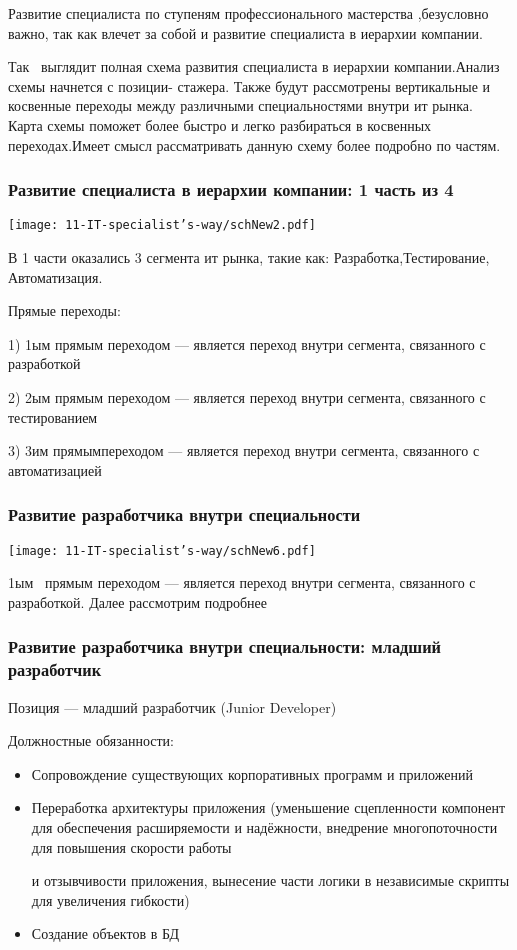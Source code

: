 \documentclass{../industrial-development}
\begin{document}
Развитие  специалиста по ступеням профессионального мастерства ,безусловно важно, так как влечет за собой и развитие специалиста в иерархии компании.

Так~\cite{mc} выглядит полная схема развития специалиста в иерархии компании.Анализ схемы начнется с позиции- стажера. Также  будут рассмотрены вертикальные и косвенные переходы между различными специальностями внутри ит рынка. Карта схемы поможет более быстро и легко разбираться в косвенных переходах.Имеет смысл рассматривать данную схему более подробно по частям.

\begin{frame} \frametitle{Развитие  специалиста в иерархии компании: 1 часть из 4 }
  \centerline{\texttt{[image: 11-IT-specialist's-way/schNew2.pdf]}}
\end{frame}

\lecturenotes

В 1 части оказались 3 сегмента ит рынка, такие как: Разработка,Тестирование, Автоматизация.

Прямые переходы:

1) 1ым прямым переходом --- является переход внутри сегмента, связанного с разработкой

2) 2ым прямым переходом --- является переход внутри сегмента, связанного с тестированием

3) 3им прямымпереходом --- является переход внутри сегмента, связанного с автоматизацией


\begin{frame} \frametitle{ Развитие разработчика внутри специальности}
 \centerline{\texttt{[image: 11-IT-specialist's-way/schNew6.pdf]}}
\end{frame}

\lecturenotes
 
1ым~\cite{mc} прямым переходом --- является переход внутри сегмента, связанного с разработкой. Далее рассмотрим подробнее

\begin{frame} \frametitle{Развитие разработчика внутри специальности: младший разработчик}
 \begin{block}{}
  \alert{Позиция --- младший разработчик (Junior Developer)}

Должностные обязанности: 
  \end{block}
  \begin{itemize}
  \item Сопровождение существующих корпоративных программ и приложений
  \item Переработка архитектуры приложения (уменьшение сцепленности компонент для обеспечения расширяемости и надёжности, внедрение многопоточности для повышения скорости работы 

и отзывчивости приложения, вынесение части логики в независимые скрипты для увеличения гибкости)
  \item Создание объектов в БД
  \end{itemize}
\end{frame}
\end{document}
